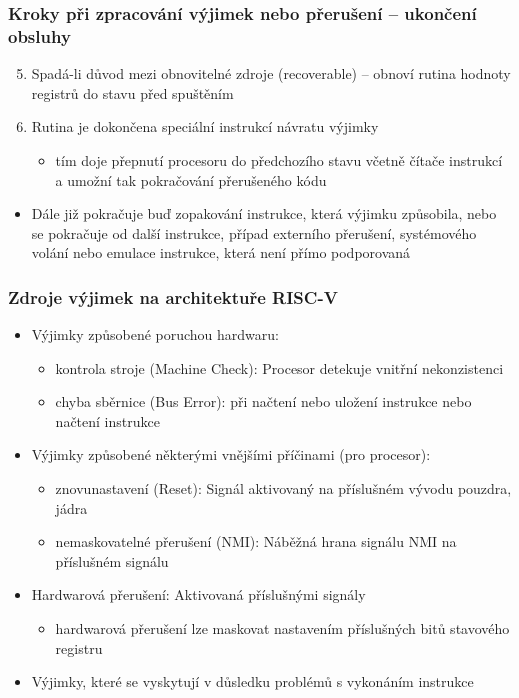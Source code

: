 \documentclass{beamer}
\begin{document}
\begin{frame}
\frametitle{Kroky při zpracování výjimek nebo přerušení -- ukončení obsluhy}

\begin{enumerate}
 \setcounter{enumi}{4}
 \item Spadá-li důvod mezi obnovitelné zdroje (recoverable) -- obnoví rutina hodnoty registrů do stavu před spuštěním
 \item Rutina je dokončena speciální instrukcí návratu výjimky
 \begin{itemize}
  \item tím doje přepnutí procesoru do předchozího stavu včetně čítače instrukcí a umožní tak pokračování
        přerušeného kódu
 \end{itemize}
\end{enumerate}
\begin{itemize}
 \item Dále již pokračuje buď zopakování instrukce, která výjimku způsobila, nebo se pokračuje od další instrukce,
       případ externího přerušení, systémového volání nebo emulace instrukce, která není přímo podporovaná
\end{itemize}
\end{frame}

\begin{frame}
\frametitle{Zdroje výjimek na architektuře RISC-V}

\begin{itemize}
 \item Výjimky způsobené poruchou hardwaru:
 \begin{itemize}
  \item kontrola stroje (Machine Check): Procesor detekuje vnitřní nekonzistenci
  \item chyba sběrnice (Bus Error): při načtení nebo uložení instrukce nebo načtení instrukce
 \end{itemize}
 \item Výjimky způsobené některými vnějšími příčinami (pro procesor):
 \begin{itemize}
  \item znovunastavení (Reset): Signál aktivovaný na příslušném vývodu pouzdra, jádra
  \item nemaskovatelné přerušení (NMI): Náběžná hrana signálu NMI na příslušném signálu
 \end{itemize}
 \item Hardwarová přerušení: Aktivovaná příslušnými signály
 \begin{itemize}
  \item hardwarová přerušení lze maskovat nastavením příslušných bitů stavového registru
 \end{itemize}
 \item Výjimky, které se vyskytují v důsledku problémů s vykonáním instrukce
\end{itemize}
\end{frame}
\end{document}
